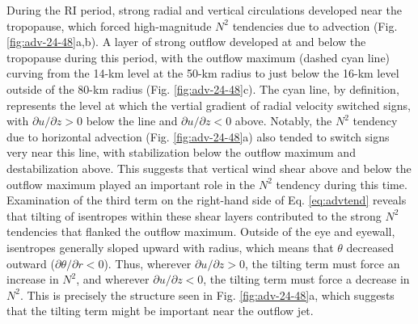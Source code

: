 \documentclass{ametsoc}
\begin{document}
%

During the RI period, strong radial and vertical circulations developed near the tropopause, which forced high-magnitude $N^2$ tendencies due to advection (Fig. \ref{fig:adv-24-48}a,b).
A layer of strong outflow developed at and below the tropopause during this period, with the outflow maximum (dashed cyan line) curving from the 14-km level at the 50-km radius to just below the 16-km level outside of the 80-km radius (Fig. \ref{fig:adv-24-48}c).
The cyan line, by definition, represents the level at which the vertial gradient of radial velocity switched signs, with $\partial u/\partial z>0$ below the line and $\partial u/\partial z<0$ above.
Notably, the $N^2$ tendency due to horizontal advection (Fig. \ref{fig:adv-24-48}a) also tended to switch signs very near this line, with stabilization below the outflow maximum and destabilization above.
This suggests that vertical wind shear above and below the outflow maximum played an important role in the $N^2$ tendency during this time.
Examination of the third term on the right-hand side of Eq. \ref{eq:advtend} reveals that tilting of isentropes within these shear layers contributed to the strong $N^2$ tendencies that flanked the outflow maximum.
Outside of the eye and eyewall, isentropes generally sloped upward with radius, which means that $\theta$ decreased outward ($\partial \theta/\partial r<0$).
Thus, wherever $\partial u/\partial z>0$, the tilting term must force an increase in $N^2$, and wherever $\partial u/\partial z<0$, the tilting term must force a decrease in $N^2$.
This is precisely the structure seen in Fig. \ref{fig:adv-24-48}a, which suggests that the tilting term might be important near the outflow jet.
\end{document}
